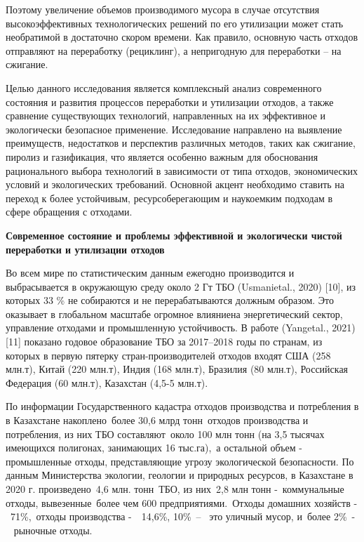 Поэтому увеличение объемов производимого мусора в случае отсутствия
высокоэффективных технологических решений по его утилизации может стать
необратимой в достаточно скором времени. Как правило, основную часть
отходов отправляют на переработку (рециклинг), а непригодную для
переработки -- на сжигание.

Целью данного исследования является комплексный анализ современного
состояния и развития процессов переработки и утилизации отходов, а также
сравнение существующих технологий, направленных на их эффективное и
экологически безопасное применение. Исследование направлено на выявление
преимуществ, недостатков и перспектив различных методов, таких как
сжигание, пиролиз и газификация, что является особенно важным для
обоснования рационального выбора технологий в зависимости от типа
отходов, экономических условий и экологических требований. Основной
акцент необходимо ставить на переход к более устойчивым,
ресурсоберегающим и наукоемким подходам в сфере обращения с отходами.

{\bfseries Современное состояние и проблемы эффективной и экологически
чистой переработки и утилизации отходов}

Во всем мире по статистическим данным ежегодно производится и
выбрасывается в окружающую среду около 2 Гт ТБО (Usmanietal., 2020)
{[}10{]}, из которых 33 \% не собираются и не перерабатываются должным
образом. Это оказывает в глобальном масштабе огромное влияниена
энергетический сектор, управление отходами и промышленную устойчивость.
В работе (Yangetal., 2021) {[}11{]} показано годовое образование ТБО за
2017--2018 годы по странам, из которых в первую пятерку
стран-производителей отходов входят США (258 млн.т), Китай (220 млн.т),
Индия (168 млн.т), Бразилия (80 млн.т), Российская Федерация (60 млн.т),
Казахстан (4,5-5 млн.т).

По информации Государственного кадастра отходов производства и
потребления в в Казахстане накоплено~более 30,6 млрд
тонн~отходов производства и потребления, из них ТБО
составляют~около 100 млн тонн (на 3,5 тысячах имеющихся полигонах,
занимающих 16 тыс.га),~а остальной объем - промышленные отходы,
представляющие угрозу экологической безопасности. По данным Министерства
экологии, геологии и природных ресурсов, в Казахстане в 2020 г.
произведено~4,6 млн. тонн~ТБО, из них~2,8 млн тонн
-~коммунальные отходы, вывезенные~более чем 600
предприятиями.~Отходы домашних хозяйств -~71\%,~отходы
производства -~~14,6\%, 10\%~--~ это уличный мусор,
и~более 2\%~-~ рыночные отходы.

